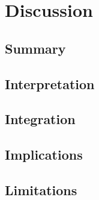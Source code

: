 \chapter{Discussion}

\section{Summary}
\label{summary}


\section{Interpretation}
\label{interpretation}


\section{Integration}
\label{integration}


\section{Implications}
\label{implications}


\section{Limitations}
\label{limitations}

